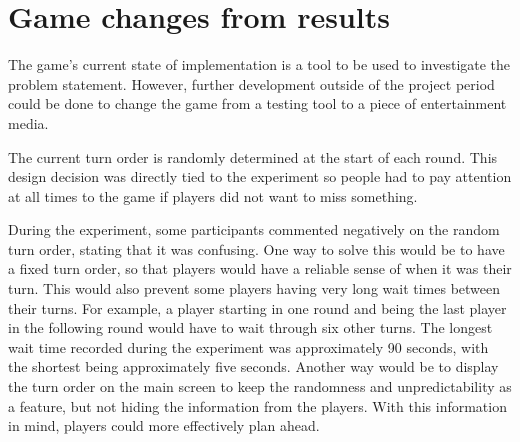 \section{Game changes from results}\label{sec:changes_from_results}
The game's current state of implementation is a tool to be used to investigate the problem statement. However, further development outside of the project period could be done to change the game from a testing tool to a piece of entertainment media. 

The current turn order is randomly determined at the start of each round. This design decision was directly tied to the experiment so people had to pay attention at all times to the game if players did not want to miss something.

During the experiment, some participants commented negatively on the random turn order, stating that it was confusing. One way to solve this would be to have a fixed turn order, so that players would have a reliable sense of when it was their turn. This would also prevent some players having very long wait times between their turns. For example, a player starting in one round and being the last player in the following round would have to wait through six other turns. The longest wait time recorded during the experiment was approximately 90 seconds, with the shortest being approximately five seconds. Another way would be to display the turn order on the main screen to keep the randomness and unpredictability as a feature, but not hiding the information from the players. With this information in mind, players could more effectively plan ahead.